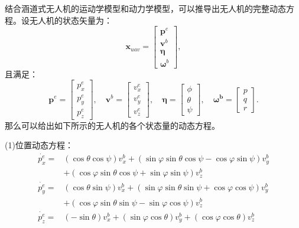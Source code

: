 结合涵道式无人机的运动学模型和动力学模型，可以推导出无人机的完整动态方程。设无人机的状态矢量为：
\begin{equation}
    \bm{x}_{uav} = 
    \begin{bmatrix}
        \bm{p}^{e} \\
        \bm{v}^{b} \\
        \bm{\eta} \\
        \bm{\omega}^{b}
    \end{bmatrix},
\end{equation}
且满足：
\begin{equation}
    \bm{p}^e = 
    \begin{bmatrix}
        p_x^e \\
        p_y^e \\
        p_z^e
    \end{bmatrix},
    \quad
    \bm{v}^b = 
    \begin{bmatrix}
        v_x^e \\
        v_y^e \\
        v_z^e
    \end{bmatrix}, 
    \quad
    \bm{\eta} = 
    \begin{bmatrix}
        \phi \\
        \theta \\
        \psi
    \end{bmatrix},
    \quad
    \bm{\omega^b} = 
    \begin{bmatrix}
        p \\
        q \\
        r
    \end{bmatrix}.
\end{equation}
那么可以给出如下所示的无人机的各个状态量的动态方程。

(1)位置动态方程：
\begin{equation}
    \begin{aligned}
        \dot{p_x^e} =& (\cos\theta\cos\psi) v_x^b + (\sin\varphi\sin\theta\cos\psi - \cos\varphi\sin\psi) v_y^b \\
        &+ 
        (\cos\varphi\sin\theta\cos\psi + \sin\varphi\sin\psi) v_z^b \\
        \dot{p_y^e} =& (\cos\theta\sin\psi) v_x^b + (\sin\varphi\sin\theta\sin\psi + \cos\varphi\cos\psi) v_y^b \\
        &+ 
        (\cos\varphi\sin\theta\sin\psi - \sin\varphi\cos\psi) v_z^b \\
        \dot{p_z^e} =& (-\sin\theta) v_x^b + (\sin\varphi\cos\theta) v_y^b + 
        (\cos\varphi\cos\theta) v_z^b
    \end{aligned}
    \label{eq:p_dynamic}
\end{equation}

